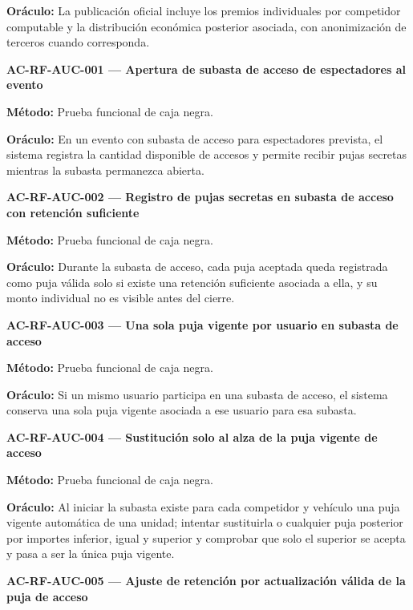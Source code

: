 \documentclass[10pt,letterpaper]{article}
\begin{document}
\textbf{Oráculo:} La publicación oficial incluye los premios individuales por competidor computable y la distribución económica posterior asociada, con anonimización de terceros cuando corresponda.\par\vspace{0.45em}
\noindent\textbf{AC-RF-AUC-001 --- Apertura de subasta de acceso de espectadores al evento}\par
\textbf{Método:} Prueba funcional de caja negra.\par
\textbf{Oráculo:} En un evento con subasta de acceso para espectadores prevista, el sistema registra la cantidad disponible de accesos y permite recibir pujas secretas mientras la subasta permanezca abierta.\par\vspace{0.45em}
\noindent\textbf{AC-RF-AUC-002 --- Registro de pujas secretas en subasta de acceso con retención suficiente}\par
\textbf{Método:} Prueba funcional de caja negra.\par
\textbf{Oráculo:} Durante la subasta de acceso, cada puja aceptada queda registrada como puja válida solo si existe una retención suficiente asociada a ella, y su monto individual no es visible antes del cierre.\par\vspace{0.45em}
\noindent\textbf{AC-RF-AUC-003 --- Una sola puja vigente por usuario en subasta de acceso}\par
\textbf{Método:} Prueba funcional de caja negra.\par
\textbf{Oráculo:} Si un mismo usuario participa en una subasta de acceso, el sistema conserva una sola puja vigente asociada a ese usuario para esa subasta.\par\vspace{0.45em}
\noindent\textbf{AC-RF-AUC-004 --- Sustitución solo al alza de la puja vigente de acceso}\par
\textbf{Método:} Prueba funcional de caja negra.\par
\textbf{Oráculo:} Al iniciar la subasta existe para cada competidor y vehículo una puja vigente automática de una unidad; intentar sustituirla o cualquier puja posterior por importes inferior, igual y superior y comprobar que solo el superior se acepta y pasa a ser la única puja vigente.\par\vspace{0.45em}
\noindent\textbf{AC-RF-AUC-005 --- Ajuste de retención por actualización válida de la puja de acceso}\par
\end{document}
